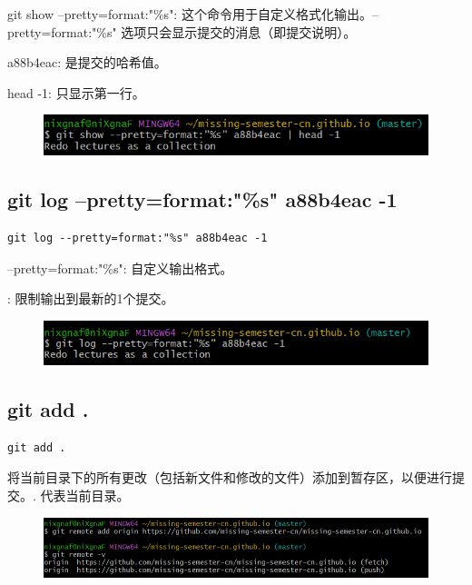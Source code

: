 \documentclass{article}
\begin{document}
\noindent git show --pretty=format:"\%s": 这个命令用于自定义格式化输出。--pretty=format:"\%s" 选项只会显示提交的消息（即提交说明）。

\noindent a88b4eac: 是提交的哈希值。

\noindent head -1: 只显示第一行。
\begin{figure}[h]
    \centering
    \includegraphics[width=1\linewidth]{picture/gitlogpretty.png}
\end{figure}

\subsection{git log --pretty=format:"\%s" a88b4eac -1}
\lstset{language=bash}
\begin{lstlisting}
git log --pretty=format:"%s" a88b4eac -1
\end{lstlisting}

\noindent --pretty=format:"\%s": 自定义输出格式。%

: 限制输出到最新的1个提交。
\begin{figure}[h]
    \centering
    \includegraphics[width=1\linewidth]{picture/gitshowpretty.png}
\end{figure}

\subsection{git add .}
\lstset{language=bash}
\begin{lstlisting}
git add .
\end{lstlisting}

\noindent 将当前目录下的所有更改（包括新文件和修改的文件）添加到暂存区，以便进行提交。. 代表当前目录。

\begin{figure}[h]
    \centering
    \includegraphics[width=1\linewidth]{picture/remoteaddd.png}
\end{figure}
\end{document}
